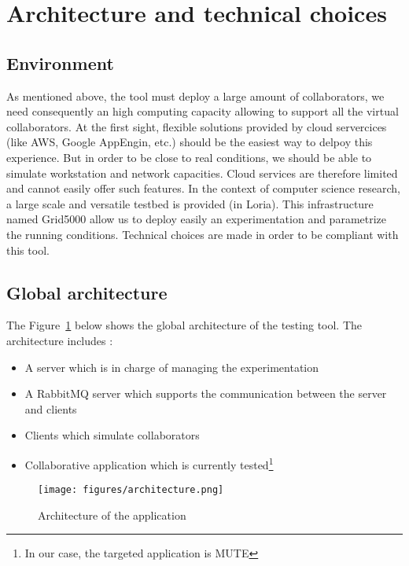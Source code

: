 \documentclass[twoside,twocolumn]{article}
\begin{document}

\section{Architecture and technical choices}

\subsection{Environment}
As mentioned above, the tool must deploy a large amount of collaborators, we need consequently an high computing capacity allowing to support all the virtual collaborators.
At the first sight, flexible solutions provided by cloud servercices (like AWS, Google AppEngin, etc.) should be the easiest way to delpoy this experience.
But in order to be close to real conditions, we should be able to simulate workstation and network capacities. Cloud services are therefore limited and cannot easily offer such features.
In the context of computer science research, a large scale and versatile testbed is provided (in Loria).
This infrastructure named Grid5000 allow us to deploy easily an experimentation and parametrize the running conditions.
Technical choices are made in order to be compliant with this tool.

\subsection{Global architecture}

The Figure~\ref{fig:archi} below shows the global architecture of the testing tool. The architecture includes :

\begin{itemize}
  \item A server which is in charge of managing the experimentation
  \item A RabbitMQ server which supports the communication between the server and clients
  \item Clients which simulate collaborators
  \item Collaborative application which is currently tested\footnote{In our case, the targeted application is MUTE}
\end{itemize}

\begin{figure}[h!]
  \centering
  \texttt{[image: figures/architecture.png]}
  \caption{Architecture of the application}
  \label{fig:archi}
\end{figure}
\end{document}
